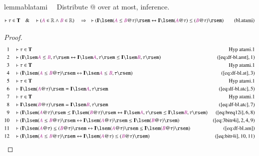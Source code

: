 \begin{restatable}{lemma}{blatami}~~ Distribute @ over at most, inference.
\begin{align}
\vdash \tau \in \mathbf{T}\quad\&\quad \vdash ( \mc{A} \in \mathbb{R} \wedge
    \mc{B} \in \mathbb{R} )\quad\Rightarrow\quad \vdash ( \mathbf{I} \lsem (
    \mc{A} \le \mc{B} @ \tau ) \rsem \leftrightarrow \mathbf{I} \lsem ( \mc{A}
    @ \tau ) \le ( \mc{B} @ \tau ) \rsem )\label{eq:bl.atami}\tag{bl.atami}
\end{align}
\end{restatable}

\begin{proof}
\begin{align}
  1 &&  & \vdash \tau \in \mathbf{T}&\text{Hyp~atami.1}\notag%
  \\ 2 &&  & \vdash ( \mathbf{I} \lsem \mc{A} \le \mc{B} , \tau \rsem
      \leftrightarrow \mathbf{I} \lsem \mc{A} , \tau \rsem
      \le \mathbf{I} \lsem \mc{B} , \tau \rsem
      )&(\mbox{\ref{eq:df-bl.amt}},1)\notag
  \\ 3 &&  & \vdash \tau \in \mathbf{T}&\text{Hyp~atami.1}\notag%
  \\ 4 &&  & \vdash ( \mathbf{I} \lsem ( \mc{A} \le \mc{B} @ \tau ) \rsem
      \leftrightarrow \mathbf{I} \lsem \mc{A} \le \mc{B} ,
      \tau \rsem )&(\mbox{\ref{eq:df-bl.at}},3)\notag
  \\ 5 &&  & \vdash \tau \in \mathbf{T}&\text{Hyp~atami.1}\notag%
  \\ 6 &&  & \vdash \mathbf{I} \lsem ( \mc{A} @ \tau ) \rsem = \mathbf{I} \lsem
      \mc{A} , \tau
      \rsem&(\mbox{\ref{eq:df-bl.atc}},5)\notag
  \\ 7 &&  & \vdash \tau \in \mathbf{T}&\text{Hyp~atami.1}\notag%
  \\ 8 &&  & \vdash \mathbf{I} \lsem ( \mc{B} @ \tau ) \rsem = \mathbf{I} \lsem
      \mc{B} , \tau
      \rsem&(\mbox{\ref{eq:df-bl.atc}},7)\notag
  \\ 9 &&  & \vdash ( \mathbf{I} \lsem ( \mc{A} @ \tau ) \rsem \le \mathbf{I}
      \lsem ( \mc{B} @ \tau ) \rsem \leftrightarrow
      \mathbf{I} \lsem \mc{A} , \tau \rsem \le \mathbf{I}
      \lsem \mc{B} , \tau \rsem
      )&(\mbox{\ref{eq:breq12i}},6,8)\notag
  \\ 10 &&  & \vdash ( \mathbf{I} \lsem ( \mc{A} \le \mc{B} @ \tau ) \rsem
      \leftrightarrow \mathbf{I} \lsem ( \mc{A} @ \tau )
      \rsem \le \mathbf{I} \lsem ( \mc{B} @ \tau ) \rsem
      )&(\mbox{\ref{eq:3bitr4i}},2,4,9)\notag
  \\ 11 &&  & \vdash ( \mathbf{I} \lsem ( \mc{A} @ \tau ) \le ( \mc{B} @ \tau )
      \rsem \leftrightarrow \mathbf{I} \lsem ( \mc{A} @
      \tau ) \rsem \le \mathbf{I} \lsem ( \mc{B} @ \tau )
      \rsem )&(\mbox{\ref{eq:df-bl.am}})\notag
  \\ 12 &&  & \vdash ( \mathbf{I} \lsem ( \mc{A} \le \mc{B} @ \tau ) \rsem
      \leftrightarrow \mathbf{I} \lsem ( \mc{A} @ \tau )
      \le ( \mc{B} @ \tau ) \rsem
      )&(\mbox{\ref{eq:bitr4i}},10,11)\notag
\end{align}
\end{proof}

